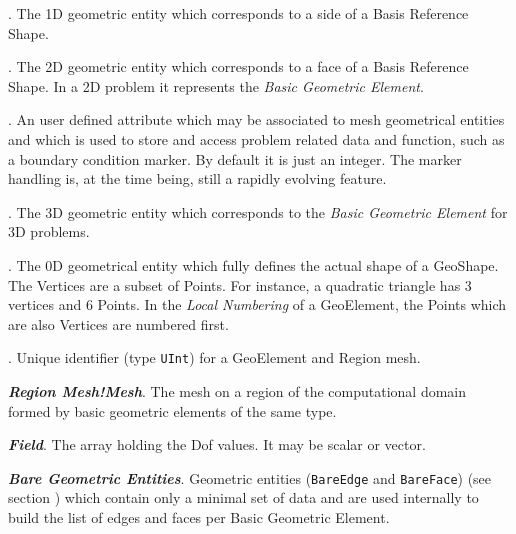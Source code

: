 \begin{description}
\item \textbf{\emph{}}. The 1D geometric entity which
  corresponds to a side of a Basis Reference Shape.
  
\item \textbf{\emph{}}. The 2D geometric entity which
  corresponds to a face of a Basis Reference Shape. In a 2D problem it
  represents the \emph{Basic Geometric Element}.
  
\item \textbf{\emph{}}. An user defined attribute which may
  be associated to mesh geometrical entities and which is used to
  store and access problem related data and function, such as a
  boundary condition marker. By default it is just an integer.  The
  marker handling is, at the time being, still a rapidly evolving
  feature.

\item \textbf{\emph{}}. The 3D geometric entity
  which corresponds to the \emph{Basic Geometric Element} for 3D
  problems.
  
\item \textbf{\emph{}}. The 0D geometrical entity
  which fully defines the actual shape of a GeoShape. The Vertices are
  a subset of Points. For instance, a quadratic triangle has 3
  vertices and 6 Points. In the \emph{Local Numbering} of a
  GeoElement, the Points which are also Vertices are numbered first.

\item \textbf{\emph{}}. Unique identifier (type \texttt{UInt})
for a GeoElement and  Region mesh. 

\item\textbf{\emph{Region Mesh!Mesh}}. The mesh on a
  region of the computational domain formed by basic geometric
  elements of the same type.

\item \textbf{\emph{Field}}. The array holding the Dof
  values. It may be scalar or vector.
  
\item \textbf{\emph{Bare Geometric Entities}}. Geometric entities (\texttt{BareEdge} and
  \texttt{BareFace}) (see section ) which contain
  only a minimal set of data and are used internally to build the list
  of edges and faces per Basic Geometric Element.


\end{description}

